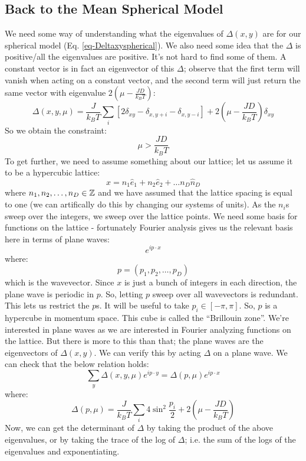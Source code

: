 \subsection{Back to the Mean Spherical Model}
We need some way of understanding what the eigenvalues of $\Delta(x, y)$ are for our spherical model (Eq. \eqref{eq-Deltaxyspherical}). We also need some idea that the $\Delta$ is positive/all the eigenvalues are positive. It's not hard to find some of them. A constant vector is in fact an eigenvector of this $\Delta$; observe that the first term will vanish when acting on a constant vector, and the second term will just return the same vector with eigenvalue $2\left(\mu - \frac{JD}{k_B T}\right)$:
\begin{equation}
    \Delta(x, y, \mu) = \frac{J}{k_B T}\sum_i\left[2\delta_{xy} - \delta_{x, y+i} - \delta_{x, y - i}\right] + 2\left(\mu - \frac{JD}{k_B T}\right)\delta_{xy}
\end{equation}
So we obtain the constraint:
\begin{equation}
    \mu > \frac{JD}{k_B T}
\end{equation}
To get further, we need to assume something about our lattice; let us assume it to be a hypercubic lattice:
\begin{equation}
    x = n_1 \hat{e}_1 + n_2 \hat{e}_2 + \ldots n_D \hat{n}_D
\end{equation}
where $n_1, n_2, \ldots, n_D \in \mathbb{Z}$ and we have assumed that the lattice spacing is equal to one (we can artifically do this by changing our systems of units). As the $n_i$s sweep over the integers, we sweep over the lattice points. We need some basis for functions on the lattice - fortunately Fourier analysis gives us the relevant basis here in terms of plane waves:
\begin{equation}
    e^{ip \cdot x}
\end{equation}
where:
\begin{equation}
    p = (p_1, p_2, \ldots, p_D)
\end{equation}
which is the wavevector. Since $x$ is just a bunch of integers in each direction, the plane wave is periodic in $p$. So, letting $p$ sweep over all wavevectors is redundant. This lets us restrict the $p$s. It will be useful to take $p_i \in [-\pi, \pi]$. So, $p$ is a hypercube in momentum space. This cube is called the ``Brillouin zone''. We're interested in plane waves as we are interested in Fourier analyzing functions on the lattice. But there is more to this than that; the plane waves are the eigenvectors of $\Delta(x, y)$. We can verify this by acting $\Delta$ on a plane wave. We can check that the below relation holds:
\begin{equation}
    \sum_y \Delta(x, y, \mu)e^{ip \cdot y} = \Delta(p, \mu)e^{ip \cdot x}
\end{equation}
where:
\begin{equation}
    \Delta(p, \mu) = \frac{J}{k_B T}\sum_i 4\sin^2\frac{p_i}{2} + 2\left(\mu - \frac{JD}{k_B T}\right)
\end{equation}
Now, we can get the determinant of $\Delta$ by taking the product of the above eigenvalues, or by taking the trace of the log of $\Delta$; i.e. the sum of the logs of the eigenvalues and exponentiating.

